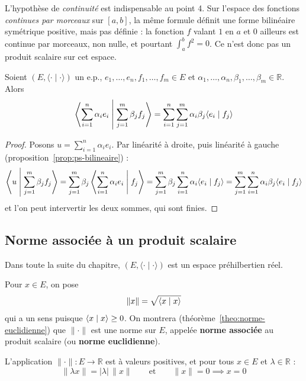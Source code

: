 \begin{remarque}
L'hypothèse de \emph{continuité} est indispensable au point 4. Sur l'espace des fonctions \emph{continues par morceaux} sur $[a,b]$, la même formule définit une forme bilinéaire symétrique positive, mais pas définie : la fonction $f$ valant $1$ en $a$ et $0$ ailleurs est continue par morceaux, non nulle, et pourtant $\int_a^bf^2=0$. Ce n'est donc pas un produit scalaire sur cet espace.
\end{remarque}

\begin{prop}
\label{prop:developpement-bilineaire}
Soient $(E,\langle\cdot\mid\cdot\rangle)$ un e.p., $e_1,\dots,e_n,f_1,\dots,f_m\in E$ et $\alpha_1,\dots,\alpha_n,\beta_1,\dots,\beta_m\in\mathbb{R}$. Alors
\[\left\langle \sum_{i=1}^n\alpha_ie_i\;\middle|\;\sum_{j=1}^m\beta_jf_j\right\rangle=\sum_{i=1}^n\sum_{j=1}^m\alpha_i\beta_j\langle e_i\mid f_j\rangle\]
\end{prop}

\begin{proof}
Posons $u=\sum_{i=1}^n\alpha_ie_i$. Par linéarité à droite, puis linéarité à gauche (proposition~\ref{prop:ps-bilineaire}) :
\[\left\langle u\;\middle|\;\sum_{j=1}^m\beta_jf_j\right\rangle=\sum_{j=1}^m\beta_j\left\langle \sum_{i=1}^n\alpha_ie_i\;\middle|\;f_j\right\rangle=\sum_{j=1}^m\beta_j\sum_{i=1}^n\alpha_i\langle e_i\mid f_j\rangle=\sum_{j=1}^m\sum_{i=1}^n\alpha_i\beta_j\langle e_i\mid f_j\rangle\]
et l'on peut intervertir les deux sommes, qui sont finies.
\end{proof}

\subsection{Norme associée à un produit scalaire}

Dans toute la suite du chapitre, $(E,\langle\cdot\mid\cdot\rangle)$ est un espace préhilbertien réel.

\begin{defi}
\label{defi:norme-associee}
Pour $x\in E$, on pose
\[\|x\|=\sqrt{\langle x\mid x\rangle}\]
qui a un sens puisque $\langle x\mid x\rangle\geq 0$. On montrera (théorème~\ref{theo:norme-euclidienne}) que $\|\cdot\|$ est une norme sur $E$, appelée \textbf{norme associée} au produit scalaire (ou \textbf{norme euclidienne}).
\end{defi}

\begin{prop}
\label{prop:norme-associee-premieres}
L'application $\|\cdot\| : E\to\mathbb{R}$ est à valeurs positives, et pour tous $x\in E$ et $\lambda\in\mathbb{R}$ :
\[\|\lambda x\|=|\lambda|\,\|x\|\qquad\text{et}\qquad\|x\|=0\implies x=0\]
\end{prop}

